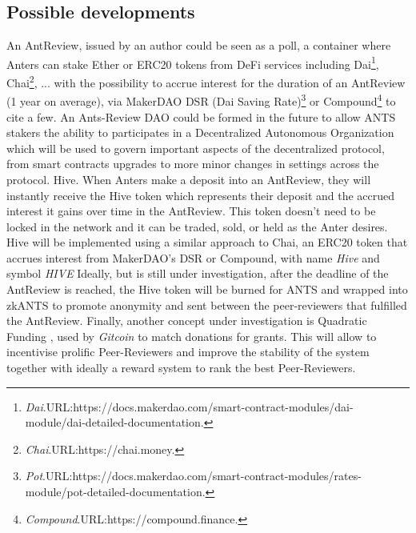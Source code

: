 \documentclass[runningheads]{llncs}
\begin{document}
\subsection{Possible developments}
An AntReview, issued by an author could be seen as a poll, a container where Anters can stake Ether or ERC20 tokens from DeFi services including Dai\footnote[11]{\emph{Dai}.\textsc{URL:}https://docs.makerdao.com/smart-contract-modules/dai-module/dai-detailed-documentation.}, Chai\footnote[12]{\emph{Chai}.\textsc{URL:}https://chai.money.}, ... with the possibility to accrue interest for the duration of an AntReview (1 year on average), via MakerDAO DSR (Dai Saving Rate)\footnote[13]{\emph{Pot}.\textsc{URL:}https://docs.makerdao.com/smart-contract-modules/rates-module/pot-detailed-documentation.} or Compound\footnote[14]{\emph{Compound}.\textsc{URL:}https://compound.finance.} to cite a few.
An Ants-Review DAO could be formed in the future to allow ANTS stakers the ability to participates in a Decentralized Autonomous Organization which will be used to govern important aspects of the decentralized protocol, from smart contracts upgrades to more minor changes in settings across the protocol.
\newline Hive. When Anters make a deposit into an AntReview, they will instantly receive the Hive token which represents their deposit and the accrued interest it gains over time in the AntReview.
\newline This token doesn't need to be locked in the network and it can be traded, sold, or held as the Anter desires.
\newline Hive will be implemented using a similar approach to Chai, an ERC20 token that accrues interest from MakerDAO's DSR or Compound, with name \emph{Hive} and symbol \emph{HIVE}
\newline Ideally, but is still under investigation, after the deadline of the AntReview is reached, the Hive token will be burned for ANTS and wrapped into zkANTS to promote anonymity and sent between the peer-reviewers that fulfilled the AntReview.
\newline Finally, another concept under investigation is Quadratic Funding \cite{LiberalRadicalism}, used by \emph{Gitcoin} to match donations for grants. This will allow to incentivise prolific Peer-Reviewers and improve the stability of the system together with ideally a reward system to rank the best Peer-Reviewers.
\end{document}
